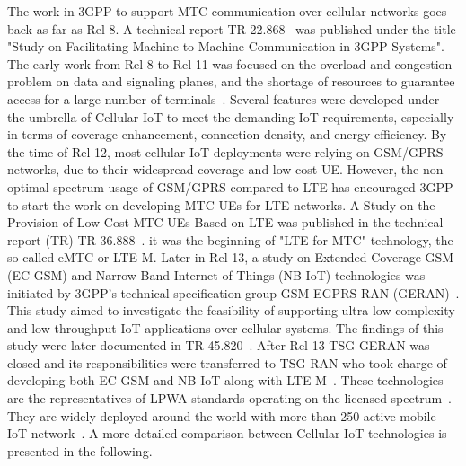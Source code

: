 \documentclass[]{IEEEtran}
\begin{document}
The work in 3GPP to support MTC communication over cellular networks goes back as far as Rel-8.
A technical report TR 22.868~\cite{TR_22.868} was published under the title "Study on Facilitating Machine-to-Machine Communication in 3GPP Systems".
The early work from Rel-8 to Rel-11 was focused on the overload and congestion problem on data and signaling planes, and the shortage of resources to guarantee access for a large number of terminals~\cite{benhiba_comparative_2018}.
Several features were developed under the umbrella of Cellular IoT to meet the demanding IoT requirements, especially in terms of coverage enhancement, connection density, and energy efficiency.
By the time of Rel-12, most cellular IoT deployments were relying on GSM/GPRS networks, due to their widespread coverage and low-cost UE.
However, the non-optimal spectrum usage of GSM/GPRS compared to LTE has encouraged 3GPP to start the work on developing MTC UEs for LTE networks.
A Study on the Provision of Low-Cost MTC UEs Based on LTE was published in the technical report (TR) TR 36.888~\cite{TR_36.888}.
it was the beginning of "LTE for MTC" technology, the so-called eMTC or LTE-M.
Later in Rel-13, a study on Extended Coverage GSM (EC-GSM) and Narrow-Band Internet of Things (NB-IoT) technologies was initiated by 3GPP's technical specification group GSM EGPRS RAN (GERAN)~\cite{liberg_cellular_2019}.
This study aimed to investigate the feasibility of supporting ultra-low complexity and low-throughput IoT applications over cellular systems.
The findings of this study were later documented in TR 45.820~\cite{TR_45.820}.
After Rel-13 TSG GERAN was closed and its responsibilities were transferred to TSG RAN who took charge of developing both EC-GSM and NB-IoT along with LTE-M~\cite{liberg_cellular_2019}.
These technologies are the representatives of LPWA standards operating on the licensed spectrum~\cite{adelantado2017understanding}.
They are widely deployed around the world with more than 250 active mobile IoT network~\cite{noauthor_mobile_nodate}.
A more detailed comparison between Cellular IoT technologies is presented in the following.
\end{document}
